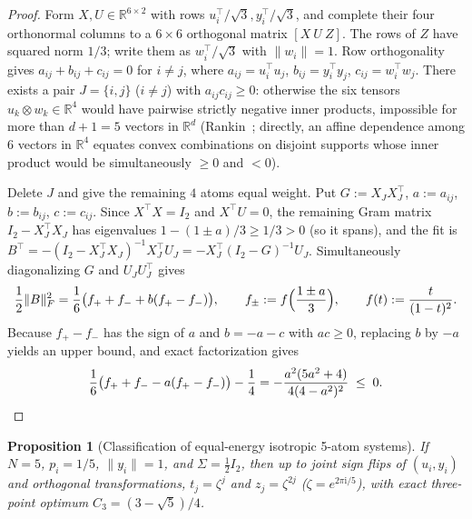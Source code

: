 \documentclass[11pt]{article}
\theoremstyle{plain}
\newtheorem{proposition}[theorem]{Proposition}
\theoremstyle{definition}
\theoremstyle{remark}
\begin{document}
\begin{proof}
Form $X, U \in \mathbb{R}^{6 \times 2}$ with rows $u_i^\top/\sqrt{3}, y_i^\top/\sqrt{3}$, and complete their four orthonormal columns to a $6 \times 6$ orthogonal matrix $[X\ U\ Z]$.
The rows of $Z$ have squared norm $1/3$; write them as $w_i^\top/\sqrt{3}$ with $\|w_i\| = 1$.
Row orthogonality gives $a_{ij} + b_{ij} + c_{ij} = 0$ for $i \neq j$, where $a_{ij} = u_i^\top u_j$, $b_{ij} = y_i^\top y_j$, $c_{ij} = w_i^\top w_j$.
There exists a pair $J = \{i, j\}$ ($i \neq j$) with $a_{ij}c_{ij} \ge 0$: otherwise the six tensors $u_k \otimes w_k \in \mathbb{R}^4$ would have pairwise strictly negative inner products, impossible for more than $d+1 = 5$ vectors in $\mathbb{R}^d$ (Rankin~\cite{Rankin1955}; directly, an affine dependence among $6$ vectors in $\mathbb{R}^4$ equates convex combinations on disjoint supports whose inner product would be simultaneously $\ge 0$ and $< 0$).

Delete $J$ and give the remaining $4$ atoms equal weight.
Put $G := X_J X_J^\top$, $a := a_{ij}$, $b := b_{ij}$, $c := c_{ij}$.
Since $X^\top X = I_2$ and $X^\top U = 0$, the remaining Gram matrix $I_2 - X_J^\top X_J$ has eigenvalues $1 - (1 \pm a)/3 \ge 1/3 > 0$ (so it spans), and the fit is $B^\top = -(I_2 - X_J^\top X_J)^{-1} X_J^\top U_J = -X_J^\top(I_2 - G)^{-1}U_J$.
Simultaneously diagonalizing $G$ and $U_J U_J^\top$ gives
\[
\frac{1}{2}\|B\|_F^2 = \frac{1}{6}\bigl(f_+ + f_- + b(f_+ - f_-)\bigr), \qquad
f_\pm := f\Bigl(\frac{1 \pm a}{3}\Bigr), \qquad f(t) := \frac{t}{(1-t)^2}.
\]
Because $f_+ - f_-$ has the sign of $a$ and $b = -a - c$ with $ac \ge 0$, replacing $b$ by $-a$ yields an upper bound, and exact factorization gives
\[
\frac{1}{6}\bigl(f_+ + f_- - a(f_+ - f_-)\bigr) - \frac{1}{4} = -\frac{a^2(5a^2 + 4)}{4(4 - a^2)^2} \;\le\; 0. \qedhere
\]
\end{proof}

\begin{proposition}[Classification of equal-energy isotropic 5-atom systems]\label{prop:5atom}
If $N = 5$, $p_i = 1/5$, $\|y_i\| = 1$, and $\Sigma = \frac{1}{2}I_2$, then up to joint sign flips of $(u_i, y_i)$ and orthogonal transformations, $t_j = \zeta^j$ and $z_j = \zeta^{2j}$ ($\zeta = e^{2\pi\mathrm{i}/5}$), with exact three-point optimum $C_3 = (3 - \sqrt{5})/4$.
\end{proposition}
\end{document}
